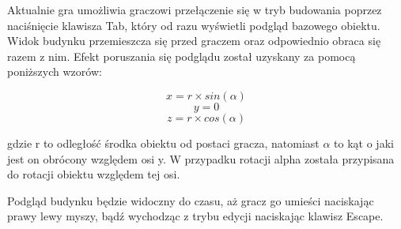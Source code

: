Aktualnie gra umożliwia graczowi przełączenie się w tryb budowania poprzez naciśnięcie klawisza Tab, który od razu wyświetli podgląd bazowego obiektu. Widok budynku przemieszcza się przed graczem oraz odpowiednio obraca się razem z nim. Efekt poruszania się podglądu został uzyskany za pomocą poniższych wzorów:

$$ x = r \times sin(\alpha) $$
$$ y = 0 $$
$$ z = r \times cos(\alpha) $$

gdzie r to odległość środka obiektu od postaci gracza, natomiast $\alpha$ to kąt o jaki jest on obrócony względem osi y. W przypadku rotacji alpha została przypisana do rotacji obiektu względem tej osi.

Podgląd budynku będzie widoczny do czasu, aż gracz go umieści naciskając prawy lewy myszy, bądź wychodząc z trybu edycji naciskając klawisz Escape.
